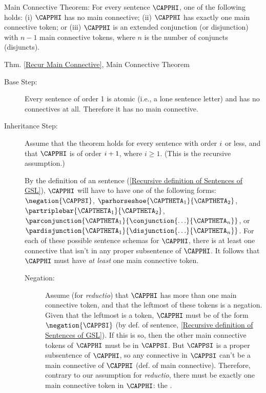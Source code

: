 \begin{THEOREM}{ Main Connective Theorem:} 
For every \GSL{} sentence $\CAPPHI$, one of the following holds: (i) $\CAPPHI$ has no main connective; (ii) $\CAPPHI$ has exactly one main connective token; or (iii) $\CAPPHI$ is an extended conjunction (or disjunction) with $n-1$ main connective tokens, where $n$ is the number of conjuncts (disjuncts).
\end{THEOREM}
\begin{PROOFOF}{Thm. \ref{Recur Main Connective}, Main Connective Theorem}
\begin{description}
\item[Base Step:] 
Every \GSL{} sentence of order 1 is atomic (i.e., a lone sentence letter) and has no connectives at all.  Therefore it has no main connective.
 
\item[Inheritance Step:] 
Assume that the theorem holds for every sentence with order $i$ or less, and that $\CAPPHI$ is of order $i+1$, where $i\geq 1$.  (This is the recursive assumption.)

By the definition of an \GSL{} sentence (\ref{Recursive definition of Sentences of GSL}), $\CAPPHI$ will have to have one of the following forms:
$\negation{\CAPPSI}$, $\parhorseshoe{\CAPTHETA_1}{\CAPTHETA_2}$, $\partriplebar{\CAPTHETA_1}{\CAPTHETA_2}$, $\parconjunction{\CAPTHETA_1}{\conjunction{\ldots}{\CAPTHETA_{\integer{n}}}}$, or $\pardisjunction{\CAPTHETA_1}{\disjunction{\ldots}{\CAPTHETA_{\integer{n}}}}$.  For each of these possible sentence schemas for $\CAPPHI$, there is at least one connective that isn't in any proper subsentence of $\CAPPHI$.  It follows that $\CAPPHI$ must have \emph{at least} one main connective token.

\begin{description}

\item[Negation:] 
Assume (for \emph{reductio}) that $\CAPPHI$ has more than one main connective token, and that the leftmost of these tokens is a negation.  Given that the leftmost is a \mention{$\NEGATION$} token, $\CAPPHI$ must be of the form $\negation{\CAPPSI}$ (by def. of \GSL{} sentence, \ref{Recursive definition of Sentences of GSL}).  If this is so, then the other main connective tokens of $\CAPPHI$ must be in $\CAPPSI$.  But $\CAPPSI$ is a proper subsentence of $\CAPPHI$, so any connective in $\CAPPSI$ can't be a main connective of $\CAPPHI$ (def. of main connective).  Therefore, contrary to our assumption for \emph{reductio}, there must be exactly one main connective token in $\CAPPHI$: the \mention{$\NEGATION$}.


\end{description}
\end{description}
\end{PROOFOF}
